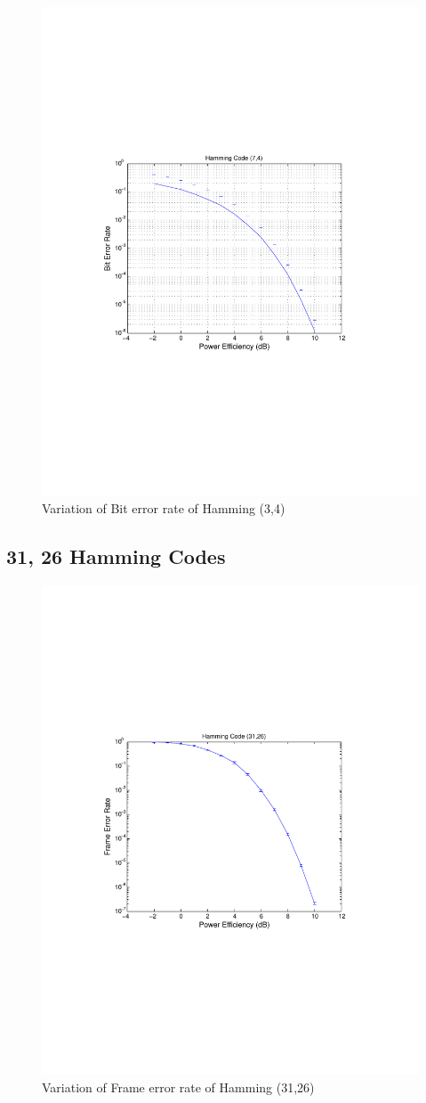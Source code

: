 \documentclass[11pt, english]{article}
\begin{document}
\begin{figure}[H]
    \centering
    \includegraphics[width=.8\textwidth]{ber_hamming_3_4.pdf}
    \caption{Variation of Bit error rate of Hamming (3,4)}
    \label{h34}
\end{figure}

\subsection{31, 26 Hamming Codes}
\begin{figure}[H]
    \centering
    \includegraphics[width=.8\textwidth]{hamming_31_26_fer.pdf}
    \caption{Variation of Frame error rate of Hamming (31,26)}
    \label{h31}
\end{figure}
\end{document}
